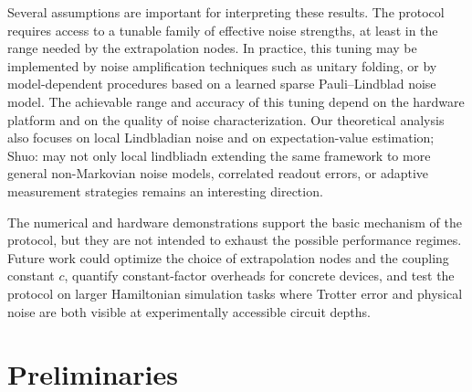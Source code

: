 \documentclass[aps,pra,reprint,groupedaddress,floatfix]{revtex4-2}
\newcommand{\sz}[1]{{\color{blue} Shuo: #1}}
\begin{document}
Several assumptions are important for interpreting these results. The protocol requires access to a tunable family of effective noise strengths, at least in the range needed by the extrapolation nodes. In practice, this tuning may be implemented by noise amplification techniques such as unitary folding, or by model-dependent procedures based on a learned sparse Pauli--Lindblad noise model. The achievable range and accuracy of this tuning depend on the hardware platform and on the quality of noise characterization. Our theoretical analysis also focuses on local Lindbladian noise and on expectation-value estimation; \sz{may not only local lindbliadn} extending the same framework to more general non-Markovian noise models, correlated readout errors, or adaptive measurement strategies remains an interesting direction.

The numerical and hardware demonstrations support the basic mechanism of the protocol, but they are not intended to exhaust the possible performance regimes. Future work could optimize the choice of extrapolation nodes and the coupling constant $c$, quantify constant-factor overheads for concrete devices, and test the protocol on larger Hamiltonian simulation tasks where Trotter error and physical noise are both visible at experimentally accessible circuit depths.

\clearpage
\appendix
\setcounter{figure}{0}
\renewcommand{\thefigure}{S\arabic{figure}}
\renewcommand{\theHfigure}{supplement.\arabic{figure}}

\section{Preliminaries}\label{append:pre}
\end{document}
